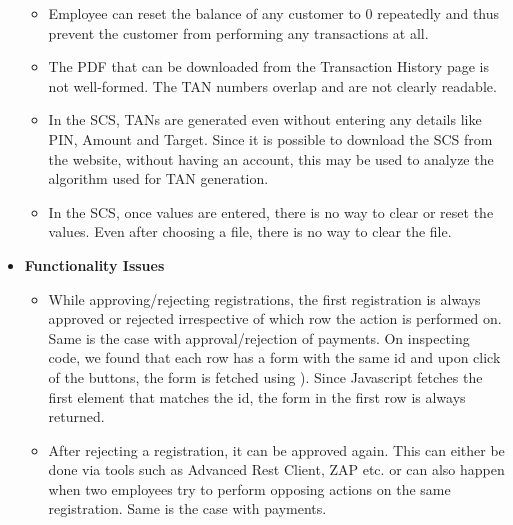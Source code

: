 \begin{itemize}
\begin{itemize}
            \item Employee can reset the balance of any customer to 0 repeatedly and thus prevent the customer from performing any transactions at all.
            \item The PDF that can be downloaded from the Transaction History page is not well-formed. The TAN numbers overlap and are not clearly readable.
            \item In the SCS, TANs are generated even without entering any details like PIN, Amount and Target. Since it is possible to download the SCS from the website, without having an account, this may be used to analyze the algorithm used for TAN generation.
            \item In the SCS, once values are entered, there is no way to clear or reset the values. Even after choosing a file, there is no way to clear the file.
        \end{itemize}
    \item \textbf{Functionality Issues}
        \begin{itemize}
            \item While approving/rejecting registrations, the first registration is always approved or rejected irrespective of which row the action is performed on. Same is the case with approval/rejection of payments. On inspecting code, we found that each row has a form with the same id  and upon click of the buttons, the form is fetched using ). Since Javascript fetches the first element that matches the id, the form in the first  row is always returned.
            \item After rejecting a registration, it can be approved again. This can either be done via tools such as Advanced Rest Client, ZAP etc. or can also happen when two employees try to perform opposing actions on the same registration. Same is the case with payments.
        \end{itemize}
\end{itemize}